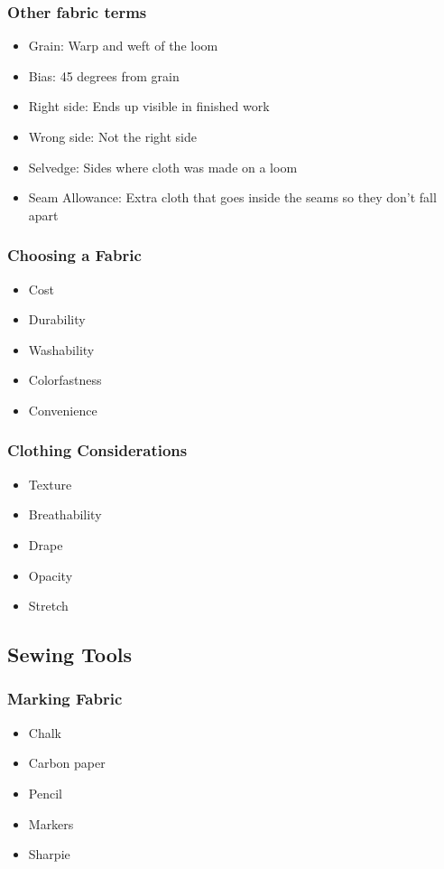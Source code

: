 \documentclass{beamer}
\begin{document}
\begin{frame}[fragile]
\frametitle{Other fabric terms}
\begin{itemize}
\item Grain: Warp and weft of the loom
\item Bias: 45 degrees from grain
\item Right side: Ends up visible in finished work
\item Wrong side: Not the right side
\item Selvedge: Sides where cloth was made on a loom
\item Seam Allowance: Extra cloth that goes inside the seams so they don't fall apart
\end{itemize}
\end{frame}

\begin{frame}[fragile]
\frametitle{Choosing a Fabric}
\begin{itemize}
\item Cost
\item Durability
\item Washability
\item Colorfastness
\item Convenience
\end{itemize}
\end{frame}

\begin{frame}[fragile]
\frametitle{Clothing Considerations}
\begin{itemize}
\item Texture
\item Breathability
\item Drape
\item Opacity
\item Stretch
\end{itemize}
\end{frame}

\subsection{Sewing Tools}

\begin{frame}[fragile]
\tableofcontents[currentsubsection]
\end{frame}


\begin{frame}[fragile]
\frametitle{Marking Fabric}
\begin{itemize}
\item Chalk
\item Carbon paper
\item Pencil
\item Markers
\item Sharpie
\end{itemize}
\end{frame}
\end{document}
